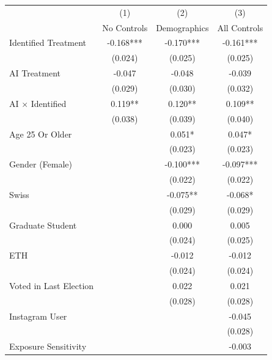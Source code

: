 \def\sym#1{\ifmmode^{#1}\else\(^{#1}\)\fi}
\begin{tabular*}{\hsize}{@{\hskip\tabcolsep\extracolsep\fill}l*{3}{c}}
\toprule
                &\multicolumn{1}{c}{(1)}&\multicolumn{1}{c}{(2)}&\multicolumn{1}{c}{(3)}\\
                &\multicolumn{1}{c}{No Controls}&\multicolumn{1}{c}{Demographics}&\multicolumn{1}{c}{All Controls}\\
\midrule
Identified Treatment&   -0.168***&   -0.170***&   -0.161***\\
                &  (0.024)   &  (0.025)   &  (0.025)   \\
\addlinespace
AI Treatment    &   -0.047   &   -0.048   &   -0.039   \\
                &  (0.029)   &  (0.030)   &  (0.032)   \\
\addlinespace
AI $\times$ Identified&    0.119** &    0.120** &    0.109** \\
                &  (0.038)   &  (0.039)   &  (0.040)   \\
\addlinespace
Age 25 Or Older &            &    0.051*  &    0.047*  \\
                &            &  (0.023)   &  (0.023)   \\
\addlinespace
Gender (Female) &            &   -0.100***&   -0.097***\\
                &            &  (0.022)   &  (0.022)   \\
\addlinespace
Swiss           &            &   -0.075** &   -0.068*  \\
                &            &  (0.029)   &  (0.029)   \\
\addlinespace
Graduate Student&            &    0.000   &    0.005   \\
                &            &  (0.024)   &  (0.025)   \\
\addlinespace
ETH             &            &   -0.012   &   -0.012   \\
                &            &  (0.024)   &  (0.024)   \\
\addlinespace
Voted in Last Election&            &    0.022   &    0.021   \\
                &            &  (0.028)   &  (0.028)   \\
\addlinespace
Instagram User  &            &            &   -0.045   \\
                &            &            &  (0.028)   \\
\addlinespace
Exposure Sensitivity&            &            &   -0.003   \\

\end{tabular*}
